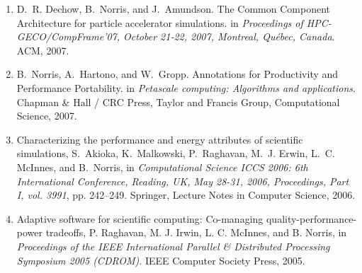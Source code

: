 \begin{enumerate}
\item
D.~R. Dechow, B.~Norris, and J.~Amundson.
\newblock The {C}ommon {C}omponent {A}rchitecture for particle accelerator
  simulations.
\newblock in {\em Proceedings of HPC-GECO/CompFrame'07, October
  21-22, 2007, Montreal, Qu\'ebec, Canada}. ACM, 2007.

\item 
B.~Norris, A.~Hartono, and W.~Gropp.
\newblock Annotations for Productivity and Performance Portability.
\newblock in \emph{Petascale computing: {A}lgorithms and applications}.
Chapman \& Hall / CRC Press, Taylor and Francis Group, Computational Science,
2007.

\item
 Characterizing the performance and energy attributes of scientific
 simulations, S.~Akioka, K.~Malkowski, P.~Raghavan, M.~J. Erwin,
 L.~C. McInnes, and B.~Norris, in {\em Computational Science ICCS
 2006: 6th International Conference, Reading, UK, May 28-31, 2006,
 Proceedings, Part I, vol. 3991}, pp. 242--249.  Springer, Lecture Notes in
 Computer Science, 2006.

\item 
Adaptive software for scientific computing: Co-managing
quality-performance-power tradeoffs, P. Raghavan, M. J. Irwin,
L. C. McInnes, and B. Norris, in {\em Proceedings of the IEEE International Parallel
\& Distributed Processing Symposium 2005 (CDROM)}. IEEE Computer Society Press,
2005.

%
%





\end{enumerate}
